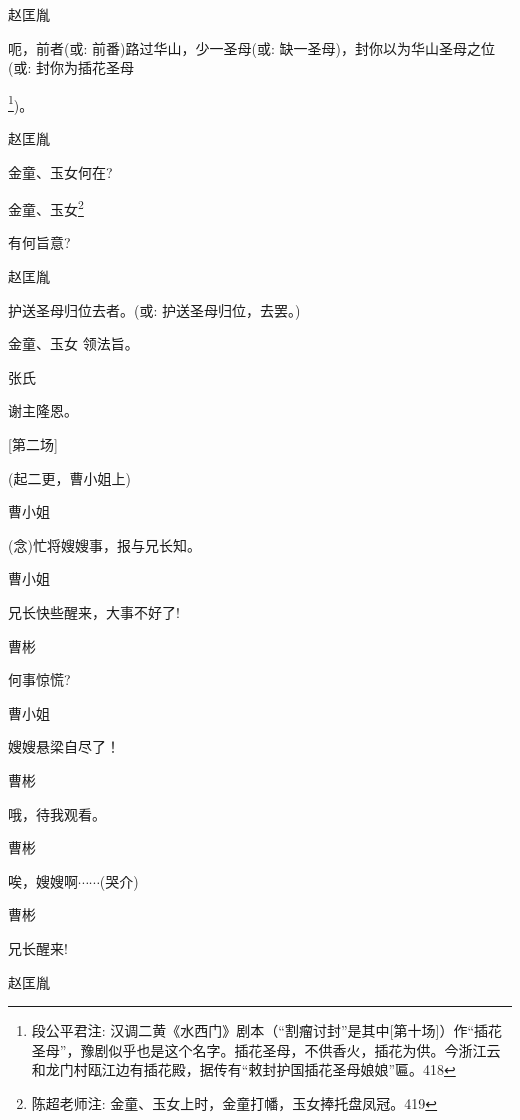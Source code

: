 {赵匡胤

呃，前者({\akai 或}: 前番)路过华山，少一圣母({\akai 或}: 缺一圣母)，封你以为华山圣母之位({\akai 或}: 封你为插花圣母}\footnote{ 段公平君注: 汉调二黄《水西门》剧本（``割瘤讨封''是其中{[}第十场{]}）作``插花圣母''，豫剧似乎也是这个名字。插花圣母，不供香火，插花为供。今浙江云和龙门村瓯江边有插花殿，据传有``敕封护国插花圣母娘娘''匾。{418}}{)。}

{赵匡胤\hspace{20pt}~

金童、玉女何在?}

{金童、玉女}\footnote{ 陈超老师注: 金童、玉女上时，金童打幡，玉女捧托盘凤冠。{419}}

{有何旨意?}

{赵匡胤\hspace{20pt}~

护送圣母归位去者。({\akai 或}: 护送圣母归位，去罢。)}

{金童、玉女 领法旨。}

{张氏\hspace{30pt}~

谢主隆恩。}

{{[}第二场{]}}

{(起二更，曹小姐上)}

{曹小姐\hspace{20pt}~

({\akai 念})忙将嫂嫂事，报与兄长知。}

{曹小姐\hspace{20pt}~

兄长快些醒来，大事不好了!}

{曹彬\hspace{30pt}~

何事惊慌?}

{曹小姐\hspace{20pt}~

嫂嫂悬梁自尽了！}

{曹彬\hspace{30pt}~

哦，待我观看。}

{曹彬\hspace{30pt}~

唉，嫂嫂啊$\cdots{}\cdots{}$(哭介)}

{曹彬\hspace{30pt}~

兄长醒来!}

{赵匡胤

 }

